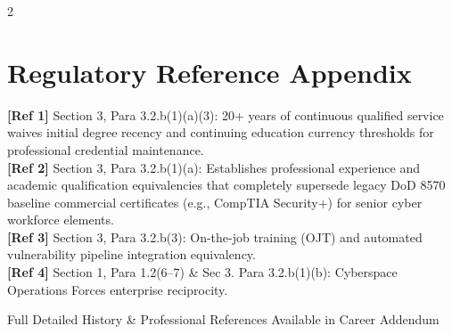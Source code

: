 \documentclass[lighthipster]{simplehipstercv}
\begin{document}
\begin{paracol}{2}
\section*{Regulatory Reference Appendix}
\footnotesize
\noindent
\hypertarget{ref1}{\textbf{[Ref 1]}} \cite{dod814003} Section 3, Para 3.2.b(1)(a)(3): 20+ years of continuous qualified service waives initial degree recency and continuing education currency thresholds for professional credential maintenance.\\
\noindent
\hypertarget{ref2}{\textbf{[Ref 2]}} \cite{dod814003} Section 3, Para 3.2.b(1)(a): Establishes professional experience and academic qualification equivalencies that completely supersede legacy DoD 8570 baseline commercial certificates (e.g., CompTIA Security+) for senior cyber workforce elements.\\
\noindent
\hypertarget{ref3}{\textbf{[Ref 3]}} \cite{dod814003} Section 3, Para 3.2.b(3): On-the-job training (OJT) and automated vulnerability pipeline integration equivalency.\\
\noindent
\hypertarget{ref4}{\textbf{[Ref 4]}} \cite{dod814003} Section 1, Para 1.2(6--7) \& Sec 3. Para 3.2.b(1)(b): Cyberspace Operations Forces enterprise reciprocity.




\vfill
\begin{center}
{\footnotesize \color{black!70} Full Detailed History \& Professional References Available in Career Addendum}
\end{center}

\end{paracol}
\end{document}
